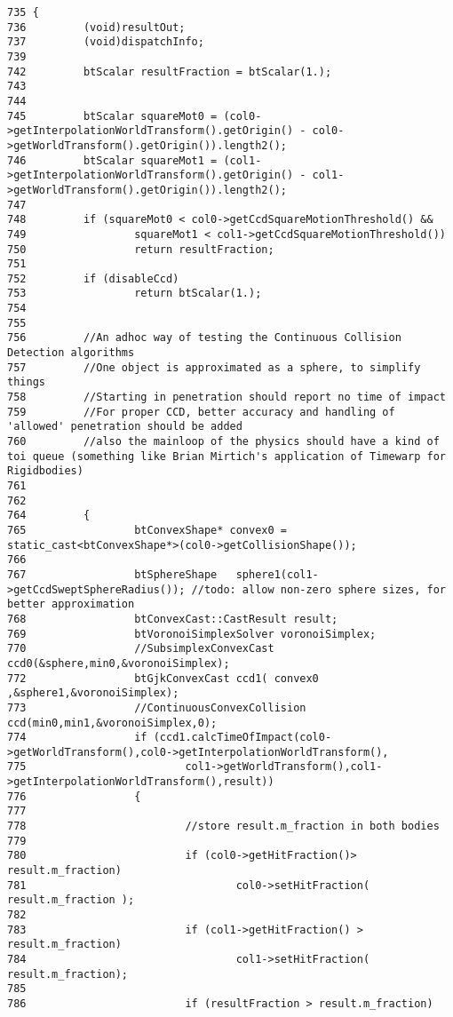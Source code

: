 \begin{Code}\begin{verbatim}735 {
736         (void)resultOut;
737         (void)dispatchInfo;
739     
742         btScalar resultFraction = btScalar(1.);
743 
744 
745         btScalar squareMot0 = (col0->getInterpolationWorldTransform().getOrigin() - col0->getWorldTransform().getOrigin()).length2();
746         btScalar squareMot1 = (col1->getInterpolationWorldTransform().getOrigin() - col1->getWorldTransform().getOrigin()).length2();
747     
748         if (squareMot0 < col0->getCcdSquareMotionThreshold() &&
749                 squareMot1 < col1->getCcdSquareMotionThreshold())
750                 return resultFraction;
751 
752         if (disableCcd)
753                 return btScalar(1.);
754 
755 
756         //An adhoc way of testing the Continuous Collision Detection algorithms
757         //One object is approximated as a sphere, to simplify things
758         //Starting in penetration should report no time of impact
759         //For proper CCD, better accuracy and handling of 'allowed' penetration should be added
760         //also the mainloop of the physics should have a kind of toi queue (something like Brian Mirtich's application of Timewarp for Rigidbodies)
761 
762                 
764         {
765                 btConvexShape* convex0 = static_cast<btConvexShape*>(col0->getCollisionShape());
766 
767                 btSphereShape   sphere1(col1->getCcdSweptSphereRadius()); //todo: allow non-zero sphere sizes, for better approximation
768                 btConvexCast::CastResult result;
769                 btVoronoiSimplexSolver voronoiSimplex;
770                 //SubsimplexConvexCast ccd0(&sphere,min0,&voronoiSimplex);
772                 btGjkConvexCast ccd1( convex0 ,&sphere1,&voronoiSimplex);
773                 //ContinuousConvexCollision ccd(min0,min1,&voronoiSimplex,0);
774                 if (ccd1.calcTimeOfImpact(col0->getWorldTransform(),col0->getInterpolationWorldTransform(),
775                         col1->getWorldTransform(),col1->getInterpolationWorldTransform(),result))
776                 {
777                 
778                         //store result.m_fraction in both bodies
779                 
780                         if (col0->getHitFraction()> result.m_fraction)
781                                 col0->setHitFraction( result.m_fraction );
782 
783                         if (col1->getHitFraction() > result.m_fraction)
784                                 col1->setHitFraction( result.m_fraction);
785 
786                         if (resultFraction > result.m_fraction)

\end{verbatim}
\end{Code}
